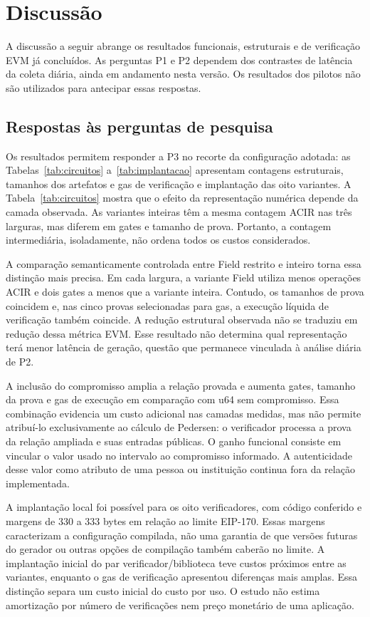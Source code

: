 \chapter{Discussão}
\label{cap:discussao}

A discussão a seguir abrange os resultados funcionais, estruturais e de verificação EVM já concluídos. As perguntas P1 e P2 dependem dos contrastes de latência da coleta diária, ainda em andamento nesta versão. Os resultados dos pilotos não são utilizados para antecipar essas respostas.

\section{Respostas às perguntas de pesquisa}

Os resultados permitem responder a P3 no recorte da configuração adotada: as Tabelas~\ref{tab:circuitos} a~\ref{tab:implantacao} apresentam contagens estruturais, tamanhos dos artefatos e gas de verificação e implantação das oito variantes. A Tabela~\ref{tab:circuitos} mostra que o efeito da representação numérica depende da camada observada. As variantes inteiras têm a mesma contagem ACIR nas três larguras, mas diferem em gates e tamanho de prova. Portanto, a contagem intermediária, isoladamente, não ordena todos os custos considerados.

A comparação semanticamente controlada entre Field restrito e inteiro torna essa distinção mais precisa. Em cada largura, a variante Field utiliza menos operações ACIR e dois gates a menos que a variante inteira. Contudo, os tamanhos de prova coincidem e, nas cinco provas selecionadas para gas, a execução líquida de verificação também coincide. A redução estrutural observada não se traduziu em redução dessa métrica EVM. Esse resultado não determina qual representação terá menor latência de geração, questão que permanece vinculada à análise diária de P2.

A inclusão do compromisso amplia a relação provada e aumenta gates, tamanho da prova e gas de execução em comparação com u64 sem compromisso. Essa combinação evidencia um custo adicional nas camadas medidas, mas não permite atribuí-lo exclusivamente ao cálculo de Pedersen: o verificador processa a prova da relação ampliada e suas entradas públicas. O ganho funcional consiste em vincular o valor usado no intervalo ao compromisso informado. A autenticidade desse valor como atributo de uma pessoa ou instituição continua fora da relação implementada.

A implantação local foi possível para os oito verificadores, com código conferido e margens de 330 a 333 bytes em relação ao limite EIP-170. Essas margens caracterizam a configuração compilada, não uma garantia de que versões futuras do gerador ou outras opções de compilação também caberão no limite. A implantação inicial do par verificador/biblioteca teve custos próximos entre as variantes, enquanto o gas de verificação apresentou diferenças mais amplas. Essa distinção separa um custo inicial do custo por uso. O estudo não estima amortização por número de verificações nem preço monetário de uma aplicação.

